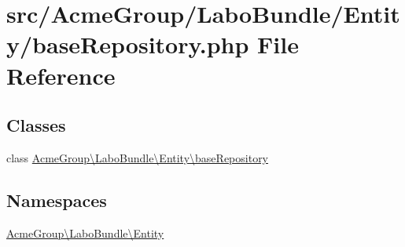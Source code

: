 \hypertarget{base_repository_8php}{\section{src/\+Acme\+Group/\+Labo\+Bundle/\+Entity/base\+Repository.php File Reference}
\label{base_repository_8php}
}
\subsection*{Classes}
\begin{DoxyCompactItemize}
\item 
class \hyperlink{class_acme_group_1_1_labo_bundle_1_1_entity_1_1base_repository}{Acme\+Group\textbackslash{}\+Labo\+Bundle\textbackslash{}\+Entity\textbackslash{}base\+Repository}
\end{DoxyCompactItemize}
\subsection*{Namespaces}
\begin{DoxyCompactItemize}
\item 
 \hyperlink{namespace_acme_group_1_1_labo_bundle_1_1_entity}{Acme\+Group\textbackslash{}\+Labo\+Bundle\textbackslash{}\+Entity}
\end{DoxyCompactItemize}
